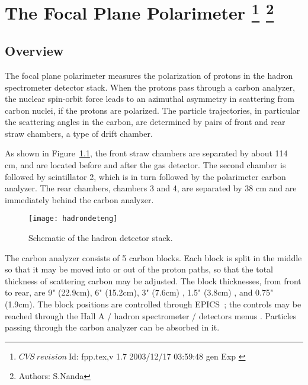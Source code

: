 \chapter[The Focal Plane Polarimeter]{The Focal Plane Polarimeter
\footnote{
  $CVS~revision~ $Id: fpp.tex,v 1.7 2003/12/17 03:59:48 gen Exp $ $
}
\footnote{Authors: S.Nanda }
}

\section{Overview}

The focal plane polarimeter measures the polarization of protons in the
hadron spectrometer detector stack.
When the protons pass through a carbon analyzer, the nuclear spin-orbit
force leads to an azimuthal asymmetry in scattering from carbon nuclei,
if the protons are polarized. 
The particle trajectories, in particular the
scattering angles in the carbon, are determined by pairs of front and rear
straw chambers, a type of drift chamber.

As shown in Figure~\ref{fig:hadron_det}, 
the front straw chambers are separated by about 114 cm, and are located
before and after the gas \Cherenkov{} detector.
The second chamber is followed by scintillator 2, which is in turn
followed by the polarimeter carbon analyzer.
The rear chambers, chambers 3 and 4, are separated by 38 cm and are
immediately behind the carbon analyzer.

\begin{figure}[bth]
\begin{center}
\texttt{[image: hadrondeteng]}
{\linespread{1.}
\caption[Detectors: Hadron Arm detector]{Schematic of the hadron detector stack.}
\label{fig:hadron_det}}
\end{center}
\end{figure}

The carbon analyzer consists of 5 carbon blocks.
Each block is split in the middle so that it may be moved into or out
of the proton paths, so that the total thickness of scattering carbon may be
adjusted.
The block thicknesses, from front to rear, are 9" (22.9cm), 6" (15.2cm), 
3" (7.6cm) , 1.5" (3.8cm) , and 0.75" (1.9cm).
The block positions are controlled through EPICS~\cite{EPICSwww}; the controls
may be reached through the Hall A / hadron spectrometer / detectors menus%
.
Particles passing through the carbon analyzer can be absorbed in it.

